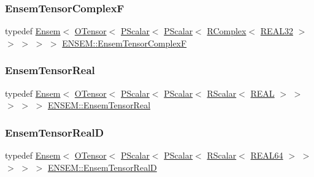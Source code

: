 \mbox{\label{group__defs_ga0db22e9868127d6f3c8d522dd70aea59}} 
\subsubsection{\texorpdfstring{EnsemTensorComplexF}{EnsemTensorComplexF}}
{\footnotesize\ttfamily typedef \mbox{\hyperlink{classENSEM_1_1Ensem}{Ensem}}$<$ \mbox{\hyperlink{classENSEM_1_1OTensor}{O\+Tensor}}$<$ \mbox{\hyperlink{classENSEM_1_1PScalar}{P\+Scalar}}$<$ \mbox{\hyperlink{classENSEM_1_1PScalar}{P\+Scalar}}$<$ \mbox{\hyperlink{classENSEM_1_1RComplex}{R\+Complex}}$<$ \mbox{\hyperlink{namespaceENSEM_a7540d01191172323e9073283d772576d}{R\+E\+A\+L32}} $>$ $>$ $>$ $>$ $>$ \mbox{\hyperlink{group__defs_ga0db22e9868127d6f3c8d522dd70aea59}{E\+N\+S\+E\+M\+::\+Ensem\+Tensor\+ComplexF}}}

\mbox{\label{group__defs_ga39dae87ed68ca227f7c9025a6e0a55b7}} 
\subsubsection{\texorpdfstring{EnsemTensorReal}{EnsemTensorReal}}
{\footnotesize\ttfamily typedef \mbox{\hyperlink{classENSEM_1_1Ensem}{Ensem}}$<$ \mbox{\hyperlink{classENSEM_1_1OTensor}{O\+Tensor}}$<$ \mbox{\hyperlink{classENSEM_1_1PScalar}{P\+Scalar}}$<$ \mbox{\hyperlink{classENSEM_1_1PScalar}{P\+Scalar}}$<$ \mbox{\hyperlink{classENSEM_1_1RScalar}{R\+Scalar}}$<$ \mbox{\hyperlink{namespaceENSEM_a6dd9aa6508168f545c861787e63ddd1e}{R\+E\+AL}} $>$ $>$ $>$ $>$ $>$ \mbox{\hyperlink{group__defs_ga39dae87ed68ca227f7c9025a6e0a55b7}{E\+N\+S\+E\+M\+::\+Ensem\+Tensor\+Real}}}

\mbox{\label{group__defs_gaa7c1a5f20d03b806876d3ab2576ec104}} 
\subsubsection{\texorpdfstring{EnsemTensorRealD}{EnsemTensorRealD}}
{\footnotesize\ttfamily typedef \mbox{\hyperlink{classENSEM_1_1Ensem}{Ensem}}$<$ \mbox{\hyperlink{classENSEM_1_1OTensor}{O\+Tensor}}$<$ \mbox{\hyperlink{classENSEM_1_1PScalar}{P\+Scalar}}$<$ \mbox{\hyperlink{classENSEM_1_1PScalar}{P\+Scalar}}$<$ \mbox{\hyperlink{classENSEM_1_1RScalar}{R\+Scalar}}$<$ \mbox{\hyperlink{namespaceENSEM_a85b215b9f1f43715aebee01718e25082}{R\+E\+A\+L64}} $>$ $>$ $>$ $>$ $>$ \mbox{\hyperlink{group__defs_gaa7c1a5f20d03b806876d3ab2576ec104}{E\+N\+S\+E\+M\+::\+Ensem\+Tensor\+RealD}}}

